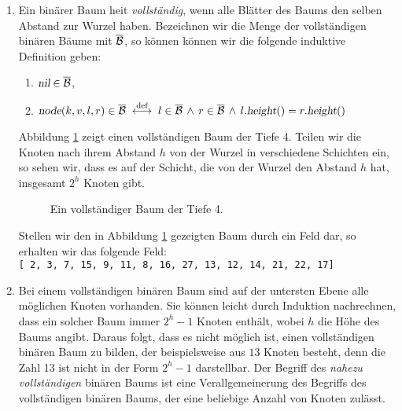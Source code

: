 \begin{enumerate}
\item Ein bin\"arer Baum hei\3t \emph{vollst\"andig}, wenn alle Bl\"atter des Baums
      den selben Abstand zur Wurzel haben.  Bezeichnen wir die Menge der vollst\"andigen bin\"aren
      B\"aume mit $\overline{\mathcal{B}}$, so k\"onnen k\"onnen wir die folgende induktive Definition geben:
      \begin{enumerate}
      \item $\textsl{nil} \in \overline{\mathcal{B}}$,
      \item $\textsl{node}(k,v,l,r) \in \overline{\mathcal{B}} 
             \;\stackrel{\mbox{\scriptsize def}}{\longleftrightarrow}\;
             l \in \overline{\mathcal{B}} \,\wedge\, r \in \overline{\mathcal{B}} \,\wedge\,
             l.\textsl{height}() = r.\textsl{height}()$ 
      \end{enumerate}
      Abbildung \ref{fig:complete-tree.eps} zeigt einen vollst\"andigen Baum der Tiefe 4.
      Teilen wir die Knoten nach ihrem Abstand $h$ von der Wurzel in verschiedene
      Schichten ein, so sehen wir, dass es auf der Schicht, die von der Wurzel den Abstand
      $h$ hat, insgesamt $2^h$ Knoten gibt.

      \begin{figure}[!ht]
        \centering
        \caption{Ein vollst\"andiger Baum der Tiefe 4.}
        \label{fig:complete-tree.eps}
      \end{figure}

      Stellen wir den in Abbildung \ref{fig:complete-tree.eps} gezeigten Baum durch ein
      Feld dar, so erhalten wir das folgende Feld: 
      \\[0.2cm]
      \hspace*{1.3cm}
      \texttt{[ 2, 3, 7, 15, 9, 11, 8, 16, 27, 13, 12, 14, 21, 22, 17]}
\item Bei einem vollst\"andigen bin\"aren Baum sind auf der untersten Ebene 
      alle m\"oglichen Knoten vorhanden.  Sie k\"onnen leicht durch Induktion nachrechnen,
      dass ein solcher Baum immer $2^h - 1$ Knoten enth\"alt, wobei $h$ die H\"ohe des Baums angibt.
      Daraus folgt, dass es nicht m\"oglich ist, einen vollst\"andigen bin\"aren Baum zu bilden,
      der beispielsweise aus $13$ Knoten besteht, denn die Zahl 13 ist nicht in der Form
      $2^h - 1$ darstellbar.  Der Begriff des \emph{nahezu vollst\"andigen} bin\"aren Baums
      ist eine Verallgemeinerung des Begriffs des vollst\"andigen bin\"aren Baums, der 
      eine beliebige Anzahl von Knoten zul\"asst.


\end{enumerate}
